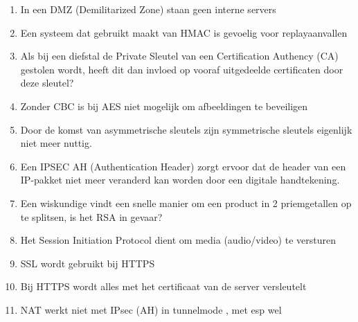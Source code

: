 \begin{enumerate}
\begin{enumerate}
\enumeratext{}

        \item In een DMZ (Demilitarized Zone) staan geen interne servers

\enumeratext{}

        \item Een systeem dat gebruikt maakt van HMAC is gevoelig voor replayaanvallen

\enumeratext{}

        \item Als bij een diefstal de Private Sleutel van een Certification Authency (CA) gestolen wordt, heeft dit dan invloed op vooraf uitgedeelde certificaten door deze sleutel?

\enumeratext{}

        \item Zonder CBC is bij AES niet mogelijk om afbeeldingen te beveiligen

\enumeratext{}

        \item Door de komst van asymmetrische sleutels zijn symmetrische sleutels eigenlijk niet meer nuttig.

\enumeratext{}

        \item Een IPSEC AH (Authentication Header) zorgt ervoor dat de header van een IP-pakket niet meer veranderd kan worden door een digitale handtekening.

\enumeratext{}

        \item Een wiskundige vindt een snelle manier om een product in 2 priemgetallen op te splitsen, is het RSA in gevaar?

\enumeratext{}

        \item Het Session Initiation Protocol dient om media (audio/video) te versturen

\enumeratext{}

        \item SSL wordt gebruikt bij HTTPS
                

                
        \item Bij HTTPS wordt alles met het certificaat van de server versleutelt

\enumeratext{}

        \item NAT werkt niet met IPsec (AH) in tunnelmode , met esp wel


\end{enumerate}
\end{enumerate}
